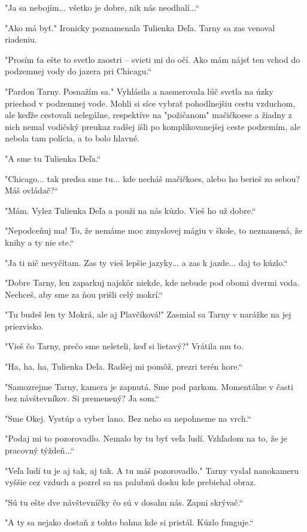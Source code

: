 \documentclass{book}
\begin{document}
"Ja sa nebojím... všetko je dobre, nik nás neodhalí...“

"$ $Ako má byť."$ $ Ironicky poznamenala Tulienka Deľa. Tarny sa zas venoval riadeniu.

"Prosím ťa ešte to svetlo zaostri – svieti mi do očí. Ako mám nájsť ten vchod do podzemnej vody do jazera pri Chicagu.“

"Pardon Tarny. Posnažím sa."$ $ Vyhlásila a nasmerovala lúč svetla na úzky priechod v podzemnej vode. Mohli si síce vybrať pohodlnejšiu cestu vzduchom, ale keďže cestovali nelegálne, respektíve na "požičanom"$ $ mačičkoese a žiadny z nich nemal vodičský preukaz radšej išli po komplikovanejšej ceste podzemím, ale nebola tam polícia, a to bolo hlavné.

"$ $A sme tu Tulienka Deľa.“

"Chicago... tak predsa sme tu... kde necháš mačičkoes, alebo ho berieš zo sebou? Máš ovládač?“

"Mám. Vylez Tulienka Deľa a použi na nás kúzlo. Vieš ho už dobre.“

"Nepodceňuj ma! To, že nemáme moc zmyslovej mágiu v škole, to neznamená, že knihy a ty nie ste.“

"Ja ti nič nevyčítam. Zas ty vieš lepšie jazyky... a zas k jazde... daj to kúzlo.“

"Dobre Tarny, len zaparkuj najskôr niekde, kde nebude pod obomi dvermi voda. 
Nechceš, aby sme za ňou prišli celý mokrí.“

"Tu budeš len ty Mokrá, ale aj Plavčíková!"$ $ Zasmial sa Tarny v narážke na jej priezvisko.

"Vieš čo Tarny, prečo sme neleteli, keď si lietavý?"$ $ Vrátila mu to.

"Ha, ha, ha, Tulienka Deľa. Radšej mi pomôž, prezri terén hore.“

"Samozrejme Tarny, kamera je zapnutá. Sme pod parkom. Momentálne v časti bez návštevníkov. Si premenený? Ja som.“

"Sme Okej. Vystúp a vyber lano. Bez neho sa nepohneme na vrch.“

"Podaj mi to pozorovadlo. Nemalo by tu byť veľa ľudí. Vzhľadom na to, že je pracovný týždeň...“

"Veľa ľudí tu je aj tak, aj tak. A tu máš pozorovadlo."$ $ Tarny vyslal nanokameru vyššie cez vzduch a pozrel sa na palubnú dosku kde prebiehal obraz.

"Sú tu ešte dve návštevníčky čo sú v dosahu nás. Zapni skrývač.“

"$ $A ty sa nejako dostaň z tohto bahna kde si pristál. Kúzlo funguje.“
\end{document}
